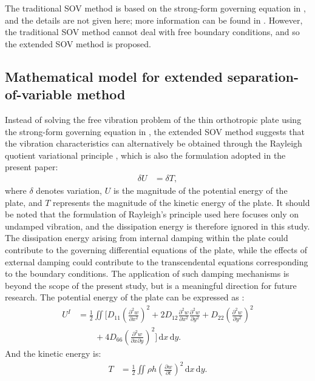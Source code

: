 \documentclass[preprint,12pt,number]{elsarticle}
\begin{document}
The traditional SOV method is based on the strong-form governing equation in , and the details are not given here; more information can be found in \cite{xing2009new}. 
However, the traditional SOV method cannot deal with free boundary conditions, and so the extended SOV method is proposed.


\subsection{Mathematical model for extended separation-of-variable method}\label{sec:esovmodel}

Instead of solving the free vibration problem of the thin orthotropic plate using the strong-form governing equation in , the extended SOV method suggests that the vibration characteristics can alternatively be obtained through the Rayleigh quotient variational principle \cite{xing2018overall}, which is also the formulation adopted in the present paper:
%
\begin{equation}\label{eq:Rayleigh}
\begin{split}
	\delta U &= \delta T,
\end{split}
\end{equation}
%
where $\delta$ denotes variation, $U$ is the magnitude of the potential energy of the plate, and $T$ represents the magnitude of the kinetic energy of the plate.
It should be noted that the formulation of Rayleigh’s principle used here focuses only on undamped vibration, and the dissipation energy is therefore ignored in this study.
The dissipation energy arising from internal damping \cite{du2025novel} within the plate could contribute to the governing differential equations of the plate,
while the effects of external damping \cite{svedholm2016vibration} could contribute to the transcendental equations corresponding to the boundary conditions.
The application of such damping mechanisms is beyond the scope of the present study, but is a meaningful direction for future research.
The potential energy of the plate can be expressed as \cite{xing2020extended}:
%
\begin{equation}\label{eq:poten_energy}
\begin{split}
	U^{I} &= \frac{1}{2}\iint \Bigg[D_{11}\left(\frac{\partial^2 w}{\partial x^2}\right)^2 + 2D_{12}\frac{\partial^2 w}{\partial x^2}\frac{\partial^2 w}{\partial y^2} + D_{22}\left(\frac{\partial^2 w}{\partial y^2}\right)^2 \\
	&\qquad + 4D_{66}\left(\frac{\partial^2 w}{\partial x \partial y}\right)^2\Bigg] \, \mathrm{d}x \, \mathrm{d}y.
\end{split}
\end{equation}
%
And the kinetic energy is:
%
\begin{equation}\label{eq:kine_energy}
\begin{split}
	T &= \frac{1}{2}\iint \rho h \left(\frac{\partial w}{\partial t}\right)^2 \, \mathrm{d}x \, \mathrm{d}y.
\end{split}
\end{equation}
\end{document}
